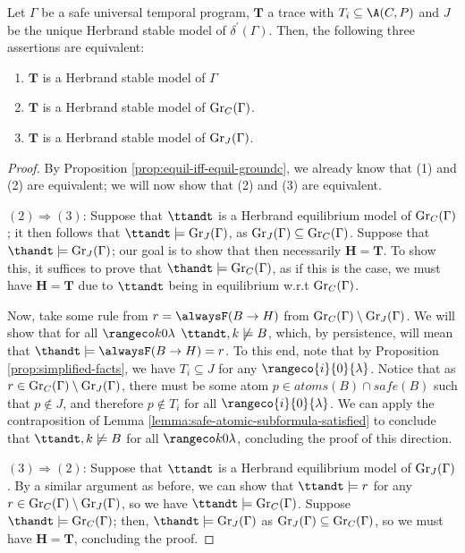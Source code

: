\begin{proposition}
  Let $\Gamma$ be a safe universal temporal program, $\bm{T}$ a trace
  with $T_i \subseteq \A(C,P)$ and $J$ be the unique Herbrand stable
  model of $\delta^{\prime}(\Gamma)$. Then, the following three
  assertions are equivalent: 
  \begin{enumerate}[label={(\arabic*)}]
    \setlength\itemsep{0.15em}
    \item $\bm{T}$ is a Herbrand stable model of $\Gamma$
    \item $\bm{T}$ is a Herbrand stable model of $\operatorname{Gr}_{C}(\Gamma)$.
    \item $\bm{T}$ is a Herbrand stable model of $\operatorname{Gr}_{J}(\Gamma)$.
  \end{enumerate}
\end{proposition}
\begin{proof}
  By Proposition \ref{prop:equil-iff-equil-groundc}, we already know that
  (1) and (2) are equivalent; we will now show that (2) and (3) are equivalent.

  $(2)\Rightarrow (3)$: Suppose that $\ttandt$ is a Herbrand equilibrium
  model of $\operatorname{Gr}_{C}(\Gamma)$; it then follows that
  $\ttandt \models \ground{J}{\Gamma}$, as
  $\operatorname{Gr}_{J}(\Gamma) \subseteq \operatorname{Gr}_{C}(\Gamma)$. Suppose that
  $\thandt \models \ground{J}{\Gamma}$; our goal is to show that then
  necessarily $\bm{H} = \bm{T}$. To show this, it suffices to prove
  that $\thandt \models \ground{C}{\Gamma}$, as if this is the case,
  we must have $\bm{H} = \bm{T}$ due to $\ttandt$ being in equilibrium
  w.r.t $\operatorname{Gr}_{C}(\Gamma)$.

  Now, take some rule from $r = \tempruleshort$ from
  $\operatorname{Gr}_{C}(\Gamma) \setminus \operatorname{Gr}_{J}(\Gamma)$.  We will show
  that for all $\kinlambda$ $\ttandt,k \not\models B$, which, by
  persistence, will mean that
  $\thandt \models \alwaysF( B \rightarrow H)=r$. To this end, note
  that by Proposition \ref{prop:simplified-facts}, we have
  $T_i \subseteq J$ for any $\rangeco{i}{0}{\lambda}$. Notice that as
  $r \in \operatorname{Gr}_{C}(\Gamma) \setminus \operatorname{Gr}_{J}(\Gamma)$, there must
  be some atom $p \in atoms(B) \cap safe(B)$ such that $p \not \in J$,
  and therefore $p \not \in T_i$ for all $\rangeco{i}{0}{\lambda}$. We can
  apply the contraposition of Lemma
  \ref{lemma:safe-atomic-subformula-satisfied} to conclude that
  $\ttandt,k \not \models B$ for all $\kinlambda$, concluding the
  proof of this direction.


  $(3)\Rightarrow (2)$: Suppose that $\ttandt$ is a Herbrand
  equilibrium model of $\operatorname{Gr}_{J}(\Gamma)$. By a similar argument as
  before, we can show that $\ttandt \models r$ for any
  $r \in \operatorname{Gr}_{C}(\Gamma) \setminus \operatorname{Gr}_{J}(\Gamma)$, so we have
  $\ttandt \models \ground{C}{\Gamma}$. Suppose
  $\thandt \models \ground{C}{\Gamma}$; then,
  $\thandt \models \ground{J}{\Gamma}$ as
  $\operatorname{Gr}_{J}(\Gamma) \subseteq \operatorname{Gr}_{C}(\Gamma)$, so we must have
  $\bm{H} = \bm{T}$, concluding the proof.
\end{proof}

